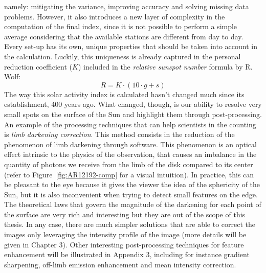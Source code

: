 namely: mitigating the variance, improving accuracy and solving missing data problems. However, it also introduces a new layer of complexity in the computation of the final index, since it is not possible to perform a simple average considering that the available stations are different from day to day. Every set-up has its own, unique properties that should be taken into account in the calculation. Luckily, this uniqueness is already captured in the personal reduction coefficient ($K$) included in the \textit{relative sunspot number} formula by R. Wolf:
\begin{equation}\label{relssnum}
R = K \cdot (10 \cdot g + s)
\end{equation}
The way this solar activity index is calculated hasn't changed much since its establishment, 400 years ago. What changed, though, is our ability to resolve very small spots on the surface of the Sun and highlight them through post-processing. \\
An example of the processing techniques that can help scientists in the counting is \textit{limb darkening correction}. This method consists in the reduction of the phenomenon of limb darkening through software. This phenomenon is an optical effect intrinsic to the physics of the observation, that causes an imbalance in the quantity of photons we receive from the limb of the disk compared to its center (refer to Figure~\ref{fig:AR12192-comp} for a visual intuition). In practice, this can be pleasant to the eye because it gives the viewer the idea of the sphericity of the Sun, but it is also inconvenient when trying to detect small features on the edge. The theoretical laws that govern the magnitude of the darkening for each point of the surface are very rich and interesting but they are out of the scope of this thesis. In any case, there are much simpler solutions that are able to correct the images only leveraging the intensity profile of the image (more details will be given in Chapter 3). Other interesting post-processing techniques for feature enhancement will be illustrated in Appendix 3, including for instance gradient sharpening, off-limb emission enhancement and mean intensity correction. \\
